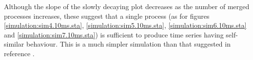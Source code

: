 Although the slope of the slowly decaying plot decreases as the number
of merged processes increases, these suggest that a single process (as
for figures \ref{simulation:sim4.10ms.sta},
\ref{simulation:sim5.10ms.sta}, \ref{simulation:sim6.10ms.sta} and
\ref{simulation:sim7.10ms.sta}) is sufficient to produce time series
having self-similar behaviour.  This is a much simpler simulation than
that suggested in reference \cite{Bell:1} \cite{Bell:2} \cite{Bell:3}
\cite{Bell:4} \cite{Bell:5}.
